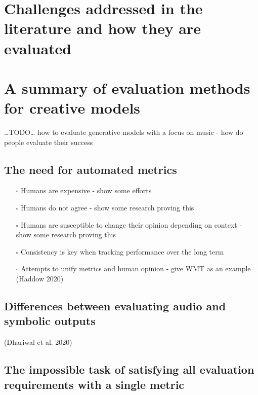 \documentclass[12pt,a4paper,]{report}
\providecommand{\tightlist}{%
  \setlength{\itemsep}{0pt}\setlength{\parskip}{0pt}}
\begin{document}
\hypertarget{challenges-addressed-in-the-literature-and-how-they-are-evaluated}{%
\section{Challenges addressed in the literature and how they are
evaluated}\label{challenges-addressed-in-the-literature-and-how-they-are-evaluated}}

\hypertarget{a-summary-of-evaluation-methods-for-creative-models}{%
\section{A summary of evaluation methods for creative
models}\label{a-summary-of-evaluation-methods-for-creative-models}}

\ldots TODO\ldots{} how to evaluate generative models with a focus on
music - how do people evaluate their success

\hypertarget{the-need-for-automated-metrics}{%
\subsection{The need for automated
metrics}\label{the-need-for-automated-metrics}}

\begin{itemize}
\tightlist
\item[$\square$]
  Humans are expensive - show some efforts
\item[$\square$]
  Humans do not agree - show some research proving this
\item[$\square$]
  Humans are susceptible to change their opinion depending on context -
  show some research proving this
\item[$\square$]
  Consistency is key when tracking performance over the long term
\item[$\square$]
  Attempts to unify metrics and human opinion - give WMT as an example
  (Haddow 2020)
\end{itemize}

\hypertarget{differences-between-evaluating-audio-and-symbolic-outputs}{%
\subsection{Differences between evaluating audio and symbolic
outputs}\label{differences-between-evaluating-audio-and-symbolic-outputs}}

(Dhariwal et al. 2020)

\hypertarget{the-impossible-task-of-satisfying-all-evaluation-requirements-with-a-single-metric}{%
\subsection{The impossible task of satisfying all evaluation
requirements with a single
metric}\label{the-impossible-task-of-satisfying-all-evaluation-requirements-with-a-single-metric}}
\end{document}
